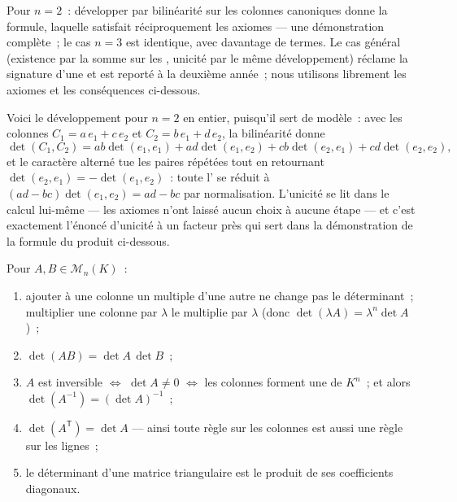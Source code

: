 \begin{remark}
Pour $n = 2$~: développer par bilinéarité sur les colonnes canoniques
donne la formule, laquelle satisfait réciproquement les axiomes ---
une démonstration complète~; le cas $n = 3$ est identique, avec
davantage de termes. Le cas général (existence par la somme sur les
, unicité par le même développement) réclame la signature
d'une  et est reporté à la deuxième année~; nous utilisons
librement les axiomes et les conséquences ci-dessous.

Voici le développement pour $n = 2$ en entier, puisqu'il sert de
modèle~: avec les colonnes $C_1 = a\,e_1 + c\,e_2$ et
$C_2 = b\,e_1 + d\,e_2$, la bilinéarité donne
\[
\det(C_1, C_2) = ab\det(e_1, e_1) + ad\det(e_1, e_2)
+ cb\det(e_2, e_1) + cd\det(e_2, e_2),
\]
et le caractère alterné tue les paires répétées tout en retournant
$\det(e_2, e_1) = -\det(e_1, e_2)$~: toute l' se réduit à
$(ad - bc)\det(e_1, e_2) = ad - bc$ par normalisation. L'unicité se
lit dans le calcul lui-même --- les axiomes n'ont laissé aucun choix
à aucune étape --- et c'est exactement l'énoncé d'unicité à un
facteur près qui sert dans la démonstration de la formule du produit
ci-dessous.
\end{remark}

\begin{theorem}[Propriétés]\label{thm:b1:det:props}
Pour $A, B \in \mathcal{M}_n(K)$~:
\begin{enumerate}
  \item ajouter à une colonne un multiple d'une autre ne change pas le
        déterminant~; multiplier une colonne par $\lambda$ le multiplie
        par $\lambda$ (donc $\det(\lambda A) = \lambda^n \det A$)~;
  \item $\det(AB) = \det A\, \det B$~;
  \item $A$ est inversible $\iff$ $\det A \neq 0$ $\iff$ les colonnes
        forment une  de $K^n$~; et alors $\det(A^{-1}) = (\det
        A)^{-1}$~;
  \item $\det(A^{\mathsf T}) = \det A$ --- ainsi toute règle sur les
        colonnes est aussi une règle sur les lignes~;
  \item le déterminant d'une matrice triangulaire est le produit de ses
        coefficients diagonaux.
\end{enumerate}
\end{theorem}

